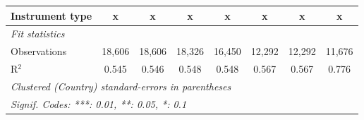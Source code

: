 \begin{table}[htbp]
\begin{tabular}{lccccccc}
      Instrument type                                                   & x             & x             & x             & x              & x              & x              & x\\  
      \midrule \emph{Fit statistics}\\
      Observations                                                      & 18,606        & 18,606        & 18,326        & 16,450         & 12,292         & 12,292         & 11,676\\  
      R$^2$                                                             & 0.545         & 0.546         & 0.548         & 0.548          & 0.567          & 0.567          & 0.776\\  
      \midrule
      \multicolumn{8}{l}{\emph{Clustered (Country) standard-errors in parentheses}}\\
      \multicolumn{8}{l}{\emph{Signif. Codes: ***: 0.01, **: 0.05, *: 0.1}}\\
   \end{tabular}
\end{table}


